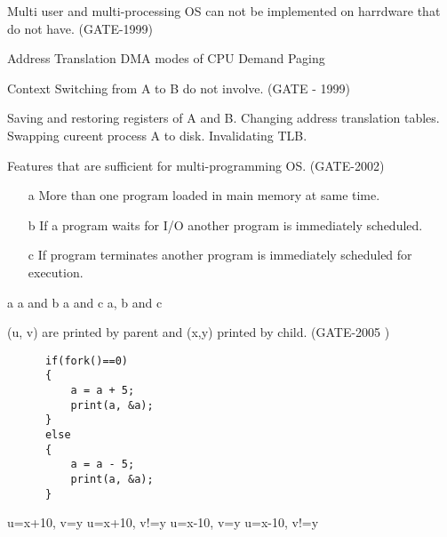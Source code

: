   \question  Multi user and multi-processing OS can not be implemented on harrdware that do not have. (GATE-1999)

  \begin{choices}
    \choice Address Translation
    \choice DMA
     modes of CPU
    \choice Demand Paging
  \end{choices}

  \question  Context Switching from A to B do not involve. (GATE - 1999)

  \begin{choices}
    \choice Saving and restoring registers of A and B.
    \choice Changing address translation tables.
    \choice Swapping cureent process A to disk.
    \choice Invalidating TLB.
  \end{choices}

  \question  Features that are sufficient for multi-programming OS. (GATE-2002)

   \begin{enumerate}
      \item[a] More than one program loaded in main memory at same time.
      \item[b] If a program waits for I/O another program is immediately scheduled.
      \item[c] If program terminates another program is immediately scheduled for execution.
   \end{enumerate}

  \begin{choices}
    \choice a
    \choice a and b
    \choice a and c
    \choice a, b and c
  \end{choices}

\begin{minipage}{\linewidth}

  \question  (u, v) are printed by parent and (x,y) printed by child. (GATE-2005 )

    \begin{lstlisting}
      if(fork()==0)
      {
          a = a + 5;
          print(a, &a);
      }
      else
      {
          a = a - 5;
          print(a, &a);
      }
    \end{lstlisting}

  \begin{choices}
    \choice u=x+10, v=y
    \choice u=x+10, v!=y
    \choice u=x-10, v=y
    \choice u=x-10, v!=y
  \end{choices}

  \end{minipage}



\begin{comment}

\begin{minipage}{\linewidth}

  \question  (GATE- )

  \begin{choices}
    \choice
    \choice
    \choice
    \choice
  \end{choices}

\end{minipage}


\end{comment}
